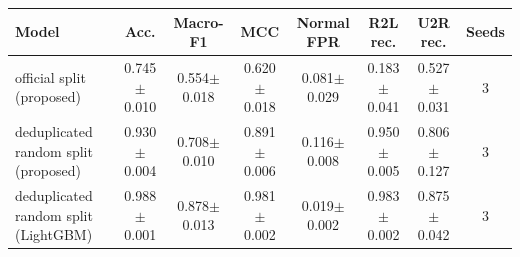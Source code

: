 \begin{tabular}{lccccccc}
\toprule
Model & Acc. & Macro-F1 & MCC & Normal FPR & R2L rec. & U2R rec. & Seeds \\
\midrule
official split (proposed) & 0.745$\pm$0.010 & 0.554$\pm$0.018 & 0.620$\pm$0.018 & 0.081$\pm$0.029 & 0.183$\pm$0.041 & 0.527$\pm$0.031 & 3 \\
deduplicated random split (proposed) & 0.930$\pm$0.004 & 0.708$\pm$0.010 & 0.891$\pm$0.006 & 0.116$\pm$0.008 & 0.950$\pm$0.005 & 0.806$\pm$0.127 & 3 \\
deduplicated random split (LightGBM) & 0.988$\pm$0.001 & 0.878$\pm$0.013 & 0.981$\pm$0.002 & 0.019$\pm$0.002 & 0.983$\pm$0.002 & 0.875$\pm$0.042 & 3 \\
\bottomrule
\end{tabular}
